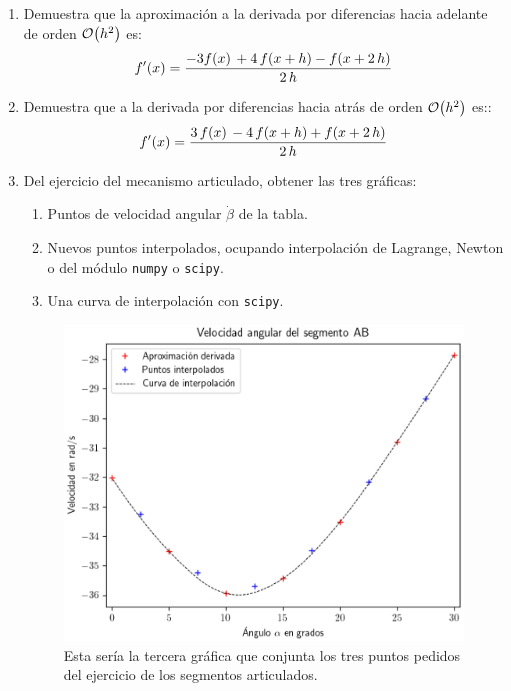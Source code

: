 \begin{enumerate}
\item Demuestra que la aproximación a la derivada por diferencias hacia adelante de orden $\order{h^{2}}$ es:
\begin{align*}
{f}^{\prime} (x) = \dfrac{- 3 f (x) \, + 4 \, f (x + h) - f (x + 2 \, h)}{2 \, h}
\end{align*}
\item Demuestra que a la derivada por diferencias hacia atrás de orden $\order{h^{2}}$ es::
\begin{align*}
{f}^{\prime} (x) = \dfrac{3 \, f (x) \, - 4 \, f (x + h) + f (x + 2 \, h)}{2 \, h}
\end{align*}
\item Del ejercicio del mecanismo articulado, obtener las tres gráficas:
\begin{enumerate}[label=\roman*)]
\item Puntos de velocidad angular $\dot{\beta}$ de la tabla.
\item Nuevos puntos interpolados, ocupando interpolación de Lagrange, Newton o del módulo \texttt{numpy} o \texttt{scipy}.
\item Una curva de interpolación con \texttt{scipy}.
\end{enumerate}
\begin{figure}[H]
    \centering
    \includegraphics[scale=0.55]{Imagenes/diferenciacion_ejercicio_segmento_03.eps}
    \caption{Esta sería la tercera gráfica que conjunta los tres puntos pedidos del ejercicio de los segmentos articulados.}
\end{figure}

\end{enumerate}
